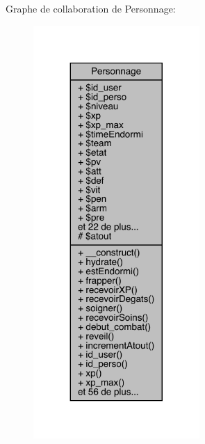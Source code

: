Graphe de collaboration de Personnage\+:\nopagebreak
\begin{figure}[H]
\begin{center}
\leavevmode
\includegraphics[width=179pt]{class_personnage__coll__graph}
\end{center}
\end{figure}
